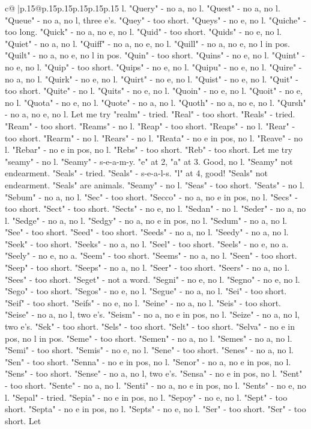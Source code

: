 \documentclass{article}
\begin{document}
{\begin{supertabular}{c@{$\;$}|p{.15\linewidth}@{}p{.15\linewidth}p{.15\linewidth}p{.15\linewidth}p{.15\linewidth}p{.15\linewidth}}
{{{l. "Query" {-} no a, no l. "Quest" {-} no a, no l. "Queue" {-} no a, no l, three e's. "Quey" {-} too short. "Queys" {-} no e, no l. "Quiche" {-} too long. "Quick" {-} no a, no e, no l. "Quid" {-} too short. "Quids" {-} no e, no l. "Quiet" {-} no a, no l. "Quiff" {-} no a, no e, no l. "Quill" {-} no a, no e, no l in pos. "Quilt" {-} no a, no e, no l in pos. "Quin" {-} too short. "Quins" {-} no e, no l. "Quint" {-} no e, no l. "Quip" {-} too short. "Quips" {-} no e, no l. "Quipu" {-} no e, no l. "Quire" {-} no a, no l. "Quirk" {-} no e, no l. "Quirt" {-} no e, no l. "Quist" {-} no e, no l. "Quit" {-} too short. "Quite" {-} no l. "Quits" {-} no e, no l. "Quoin" {-} no e, no l. "Quoit" {-} no e, no l. "Quota" {-} no e, no l. "Quote" {-} no a, no l. "Quoth" {-} no a, no e, no l. "Qursh" {-} no a, no e, no l. Let me try "realm" {-} tried. "Real" {-} too short. "Reals" {-} tried. "Ream" {-} too short. "Reams" {-} no l. "Reap" {-} too short. "Reaps" {-} no l. "Rear" {-} too short. "Rearm" {-} no l. "Rears" {-} no l. "Reata" {-} no e in pos, no l. "Reave" {-} no l. "Rebar" {-} no e in pos, no l. "Rebs" {-} too short. "Reb" {-} too short. Let me try "seamy" {-} no l. "Seamy" {-} s{-}e{-}a{-}m{-}y. "e" at 2, "a" at 3. Good, no l. "Seamy" not endearment. "Seals" {-} tried. "Seals" {-} s{-}e{-}a{-}l{-}s. "l" at 4, good! "Seals" not endearment. "Seals" are animals. "Seamy" {-} no l. "Seas" {-} too short. "Seats" {-} no l. "Sebum" {-} no a, no l. "Sec" {-} too short. "Secco" {-} no a, no e in pos, no l. "Secs" {-} too short. "Sect" {-} too short. "Sects" {-} no e, no l. "Sedan" {-} no l. "Seder" {-} no a, no l. "Sedge" {-} no a, no l. "Sedgy" {-} no a, no e in pos, no l. "Sedum" {-} no a, no l. "See" {-} too short. "Seed" {-} too short. "Seeds" {-} no a, no l. "Seedy" {-} no a, no l. "Seek" {-} too short. "Seeks" {-} no a, no l. "Seel" {-} too short. "Seels" {-} no e, no a. "Seely" {-} no e, no a. "Seem" {-} too short. "Seems" {-} no a, no l. "Seen" {-} too short. "Seep" {-} too short. "Seeps" {-} no a, no l. "Seer" {-} too short. "Seers" {-} no a, no l. "Sees" {-} too short. "Seget" {-} not a word. "Segni" {-} no e, no l. "Segno" {-} no e, no l. "Sego" {-} too short. "Segos" {-} no e, no l. "Segue" {-} no a, no l. "Sei" {-} too short. "Seif" {-} too short. "Seifs" {-} no e, no l. "Seine" {-} no a, no l. "Seis" {-} too short. "Seise" {-} no a, no l, two e's. "Seism" {-} no a, no e in pos, no l. "Seize" {-} no a, no l, two e's. "Sek" {-} too short. "Sels" {-} too short. "Selt" {-} too short. "Selva" {-} no e in pos, no l in pos. "Seme" {-} too short. "Semen" {-} no a, no l. "Semes" {-} no a, no l. "Semi" {-} too short. "Semis" {-} no e, no l. "Sene" {-} too short. "Senes" {-} no a, no l. "Sen" {-} too short. "Senna" {-} no e in pos, no l. "Senor" {-} no a, no e in pos, no l. "Sens" {-} too short. "Sense" {-} no a, no l, two e's. "Sensa" {-} no e in pos, no l. "Sent" {-} too short. "Sente" {-} no a, no l. "Senti" {-} no a, no e in pos, no l. "Sents" {-} no e, no l. "Sepal" {-} tried. "Sepia" {-} no e in pos, no l. "Sepoy" {-} no e, no l. "Sept" {-} too short. "Septa" {-} no e in pos, no l. "Septs" {-} no e, no l. "Ser" {-} too short. "Ser" {-} too short. Let }}}
\end{supertabular}}
\end{document}
